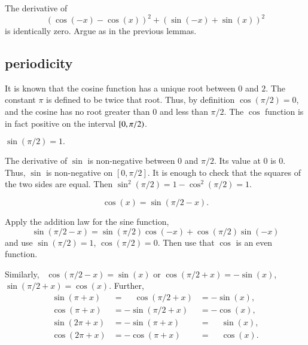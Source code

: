 \begin{proved}
The derivative of
    $$(\cos(-x) - \cos(x))^2 + (\sin(-x) +\sin(x))^2$$
is identically zero.  Argue as in the previous lemmas.
\swallowed\end{proved}

\subsection{periodicity}
\label{sec:pi}
%

It is known that the cosine function has a unique root between $0$
and $2$. The constant $\pi$ is defined to be twice that root.  Thus, by
definition $\cos(\pi/2) = 0$, and the cosine has no root greater
than $0$ and less than $\pi/2$. The $\cos$ function is in fact
positive on the interval $[ 0,\pi/2)$.
%

\begin{lemma}\label{lemma:sin-pi2}
    $\sin (\pi/2) = 1.$
\end{lemma}

\begin{proved}
The derivative of $\sin$ is non-negative between $0$ and $\pi/2$.
Its value at $0$ is $0$.  Thus, $\sin$ is non-negative on
$[0,\pi/2]$.  It is enough to check
that the squares of the two sides are equal. Then $\sin^2(\pi/2) =
{1-\cos^2(\pi/2)} = 1$.
\swallowed\end{proved}

\begin{lemma}\label{lemma:cos-sin}
    $$\cos(x) = \sin(\pi/2 - x).$$
\end{lemma}

\begin{proved}
    Apply the addition law for the sine function,
    $$\sin(\pi/2 - x) = \sin(\pi/2)\cos(-x) + \cos(\pi/2)\sin(-x)$$
    and use
    $\sin(\pi/2) = 1$, $\cos(\pi/2) = 0$.  Then use that $\cos$ is
    an even function.
\swallowed\end{proved}

Similarly,~%
%
$\cos(\pi/2 - x) = \sin(x)$ or $\cos(\pi/2 + x) =
-\sin(x)$, $\sin(\pi/2 + x) = \cos(x)$.  Further,
    $$\begin{array}{lll}
      \sin(\pi + x) &= \phantom{-}\cos(\pi/2 + x) &= -\sin(x),\\
      \cos(\pi + x) &= -\sin(\pi/2 + x) &= -\cos(x),\\
      \sin(2\pi + x) &= -\sin(\pi + x) &= \phantom{-}\sin(x),\\
      \cos(2\pi + x) &= -\cos(\pi + x) &= \phantom{-}\cos(x).
      \end{array}$$
%
%



